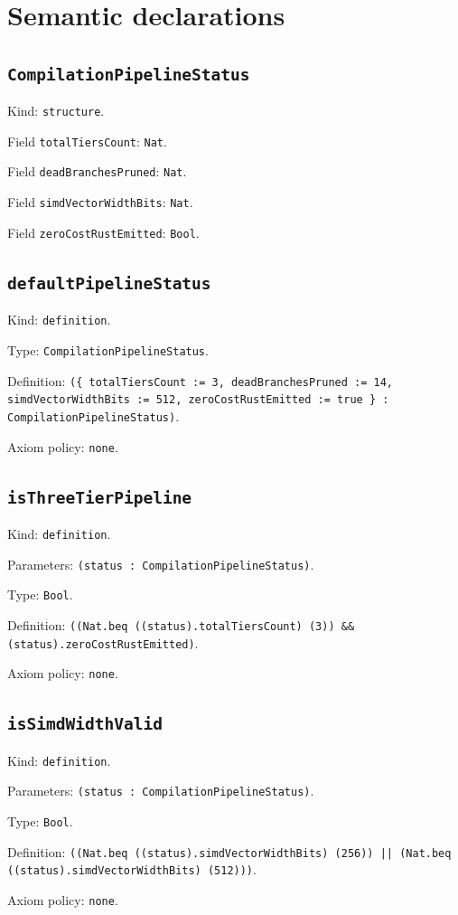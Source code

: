 \documentclass[11pt]{article}
\begin{document}
\section*{Semantic declarations}
\subsection*{\texttt{CompilationPipelineStatus}}
\noindent Kind: \texttt{structure}.\par
\noindent Field \texttt{totalTiersCount}: \texttt{Nat}.\par
\noindent Field \texttt{deadBranchesPruned}: \texttt{Nat}.\par
\noindent Field \texttt{simdVectorWidthBits}: \texttt{Nat}.\par
\noindent Field \texttt{zeroCostRustEmitted}: \texttt{Bool}.\par
\subsection*{\texttt{defaultPipelineStatus}}
\noindent Kind: \texttt{definition}.\par
\noindent Type: \texttt{CompilationPipelineStatus}.\par
\noindent Definition: \texttt{(\{ totalTiersCount := 3, deadBranchesPruned := 14, simdVectorWidthBits := 512, zeroCostRustEmitted := true \} : CompilationPipelineStatus)}.\par
\noindent Axiom policy: \texttt{none}.\par
\subsection*{\texttt{isThreeTierPipeline}}
\noindent Kind: \texttt{definition}.\par
\noindent Parameters: \texttt{(status : CompilationPipelineStatus)}.\par
\noindent Type: \texttt{Bool}.\par
\noindent Definition: \texttt{((Nat.beq ((status).totalTiersCount) (3)) \&\& (status).zeroCostRustEmitted)}.\par
\noindent Axiom policy: \texttt{none}.\par
\subsection*{\texttt{isSimdWidthValid}}
\noindent Kind: \texttt{definition}.\par
\noindent Parameters: \texttt{(status : CompilationPipelineStatus)}.\par
\noindent Type: \texttt{Bool}.\par
\noindent Definition: \texttt{((Nat.beq ((status).simdVectorWidthBits) (256)) || (Nat.beq ((status).simdVectorWidthBits) (512)))}.\par
\noindent Axiom policy: \texttt{none}.\par
\end{document}
